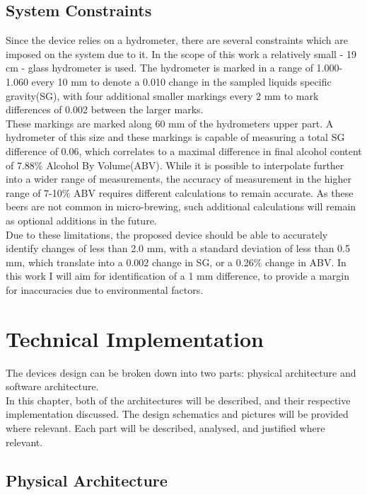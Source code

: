 \documentclass[twoside]{ctuthesis}
\theoremstyle{plain}
\theoremstyle{definition}
\theoremstyle{note}
\begin{document}
\section{System Constraints}
Since the device relies on a hydrometer, there are several constraints which are imposed on the system due to it. In the scope of this work a relatively small - 19 cm - glass hydrometer is used. The hydrometer is marked in a range of 1.000-1.060 every 10 mm to denote a 0.010 change in the sampled liquids specific gravity(SG), with four additional smaller markings every 2 mm to mark differences of 0.002 between the larger marks.\\
These markings are marked along 60 mm of the hydrometers upper part. A hydrometer of this size and these markings is capable of measuring a total SG difference of 0.06, which correlates to a maximal difference in final alcohol content of 7.88$\%$ Alcohol By Volume(ABV). While it is possible to interpolate further into a wider range of measurements, the accuracy of measurement in the higher range of 7-10$\%$ ABV requires different calculations to remain accurate\cite{Joy_Of_Brewing}. As these beers are not common in micro-brewing, such additional calculations will remain as optional additions in the future.\\
Due to these limitations, the proposed device should be able to accurately identify changes of less than 2.0 mm, with a standard deviation of less than 0.5 mm, which translate into a 0.002 change in SG, or a 0.26$\%$ change in ABV. In this work I will aim for identification of a 1 mm difference, to provide a margin for inaccuracies due to environmental factors.


\pagebreak

\begingroup
\renewcommand{\cleardoublepage}{}
\renewcommand{\clearpage}{}
\chapter{Technical Implementation}
\endgroup

The devices design can be broken down into two parts: physical architecture and software architecture.\\
In this chapter, both of the architectures will be described, and their respective implementation discussed. The design schematics and pictures will be provided where relevant. Each part will be described, analysed, and justified where relevant.

\section{Physical Architecture}
\end{document}
